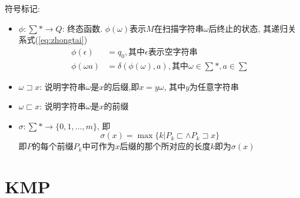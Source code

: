 符号标记:
\begin{itemize}
    \item $\phi: \sum* \to Q$: 终态函数. $\phi(\omega)$表示$M$在扫描字符串$\omega$后终止的状态, 其递归关系式(\ref{eq:zhongtai}) \
    \begin{equation}
        \begin{split}
            \phi(\epsilon) &= q_0, \text{其中}\epsilon\text{表示空字符串} \\
            \phi(\omega a) &= \delta(\phi(\omega), a), \text{其中}\omega \in \sum*, a \in \sum
        \end{split} \label{eq:zhongtai}
    \end{equation}
    \item $\omega \sqsupset x$: 说明字符串$\omega$是$x$的后缀,即$x=y\omega$, 其中$y$为任意字符串
    \item $\omega \sqsubset x$: 说明字符串$\omega$是$x$的前缀
    \item $\sigma: \sum* \to \{0,1,\dots,m\}$, 即 \
        \begin{equation}
            \sigma(x) = \max\{k | P_k \sqsubset \wedge P_k \sqsupset x\}
        \end{equation}
        即$P$的每个前缀$P_k$中可作为$x$后缀的那个所对应的长度$k$即为$\sigma(x)$
\end{itemize}

\section*{KMP}
